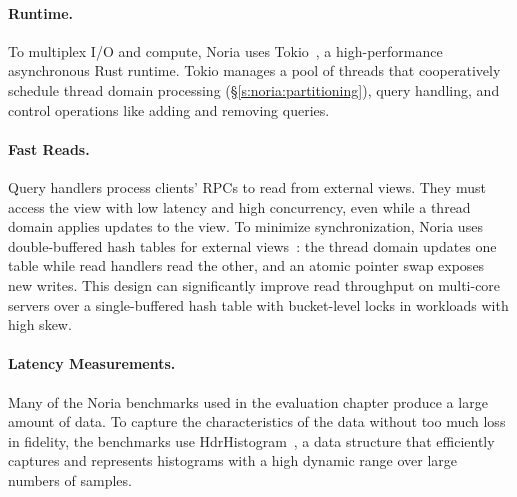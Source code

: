 \paragraph{Runtime.}
To multiplex I/O and compute, Noria uses Tokio~\cite{tokio}, a high-performance
asynchronous Rust runtime. Tokio manages a pool of threads that cooperatively
schedule thread domain processing (\S\ref{s:noria:partitioning}), query
handling, and control operations like adding and removing queries.

\paragraph{Fast Reads.}
Query handlers process clients' RPCs to read from external views. They must
access the view with low latency and high concurrency, even while a thread
domain applies updates to the view. To minimize synchronization, Noria uses
double-buffered hash tables for external views~\cite{evmap}: the thread domain
updates one table while read handlers read the other, and an atomic pointer
swap exposes new writes. This design can significantly improve read throughput
on multi-core servers over a single-buffered hash table with bucket-level locks
in workloads with high skew.

\paragraph{Latency Measurements.}
Many of the Noria benchmarks used in the evaluation chapter produce a large
amount of data. To capture the characteristics of the data without too much loss
in fidelity, the benchmarks use HdrHistogram~\cite{hdrhistogram}, a data
structure that efficiently captures and represents histograms with a high
dynamic range over large numbers of samples.
